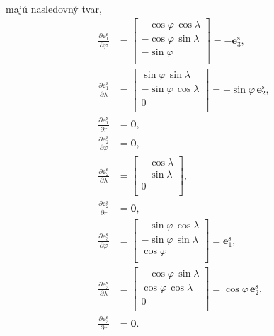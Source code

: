 \documentclass[a4paper, 12pt]{book}
\let\vec\mathbf
\begin{document}
majú nasledovný tvar,
%
\begin{equation}
\label{eq:er_elat_elon_unit_derivatives}
\begin{split}
\frac{\partial \vec e_1^\mathrm{s}}{\partial \varphi} &=
%
\begin{bmatrix}
-\cos\varphi \, \cos\lambda\\
-\cos\varphi \, \sin\lambda\\
-\sin\varphi\\
\end{bmatrix}
%
= -\vec e_3^\mathrm{s}
%
{,}\\
%
\frac{\partial \vec e_1^\mathrm{s}}{\partial \lambda} &=
%
\begin{bmatrix}
 \sin\varphi \, \sin\lambda\\
-\sin\varphi \, \cos\lambda\\
0\\
\end{bmatrix}
%
= -\sin\varphi \, \vec e_2^\mathrm{s}
%
{,}\\
%
\frac{\partial \vec e_1^\mathrm{s}}{\partial r} &= \vec 0{,}\\
%
\frac{\partial \vec e_2^\mathrm{s}}{\partial \varphi} &= \vec 0{,}\\
%
\frac{\partial \vec e_2^\mathrm{s}}{\partial \lambda} &=
%
\begin{bmatrix}
-\cos\lambda\\
-\sin\lambda\\
0\\
\end{bmatrix}
%
{,}\\
%
\frac{\partial \vec e_2^\mathrm{s}}{\partial r} &= \vec 0{,}\\
%
\frac{\partial \vec e_3^\mathrm{s}}{\partial \varphi} &=
%
\begin{bmatrix}
-\sin\varphi \, \cos\lambda\\
-\sin\varphi \, \sin\lambda\\
\cos\varphi\\
\end{bmatrix}
%
= \vec e_1^\mathrm{s}
%
{,}\\
%
\frac{\partial \vec e_3^\mathrm{s}}{\partial \lambda} &=
%
\begin{bmatrix}
-\cos\varphi \, \sin\lambda\\
 \cos\varphi \, \cos\lambda\\
0\\
\end{bmatrix}
%
= \cos\varphi \, \vec e_2^\mathrm{s}
%
{,}\\
%
\frac{\partial \vec e_3^\mathrm{s}}{\partial r} &= \vec 0{.}
\end{split}
\end{equation}
\end{document}
